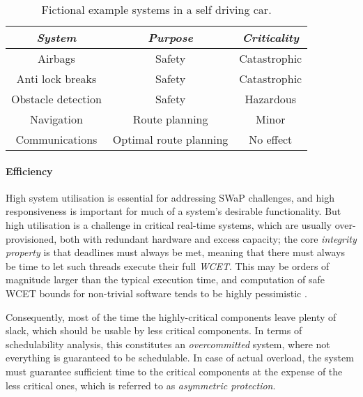\begin{table} 
\centering
\begin{tabular}{ccc}\toprule
    \emph{System}     & \emph{Purpose} & \emph{Criticality} \\\midrule
     Airbags            & Safety &  Catastrophic \\
     Anti lock breaks   & Safety &  Catastrophic \\
     Obstacle detection & Safety &  Hazardous    \\
     Navigation         & Route planning & Minor \\  
     Communications     & Optimal route planning & No effect \\
    \bottomrule
\end{tabular}
\caption{Fictional example systems in a self driving car.}
\label{tab:self-driving-car}
\end{table}



\paragraph{Efficiency}

High system utilisation is essential for addressing SWaP challenges, and high responsiveness is
important for much of a system's desirable functionality. But high utilisation is a challenge in
critical real-time systems, which are usually over-provisioned, both with redundant hardware and 
excess capacity; the core \emph{integrity property} is that deadlines must always be
met, meaning that there must always be time to let such threads execute their full \emph{\gls{WCET}}.
This may be orders of magnitude larger than the typical execution time, and
computation of safe \gls{WCET} bounds for non-trivial software tends to be highly pessimistic
\citep{Wilhelm_EEHTWBFHMMPPSS_08}.  

Consequently, most of the time the highly-critical components
leave plenty of slack, which should be usable by less critical components. In terms of
schedulability analysis, this constitutes an \emph{overcommitted} system, where not everything is
guaranteed to be schedulable.  In case of actual overload, the system must guarantee sufficient time
to the critical components at the expense of the less critical ones, which is referred to as
\emph{asymmetric protection}.

